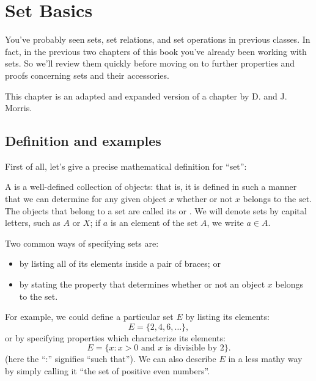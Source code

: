 




\section{Set Basics}

You've probably seen sets, set relations, and set operations in previous classes.  In fact, in the previous two chapters of this book you've already been working with sets.  So we'll review them quickly before moving on to further properties and proofs concerning sets and their accessories.
\medskip

This chapter is an adapted and expanded version of a chapter by D. and J. Morris.
 
\subsection{Definition and examples}

First of all, let's give a precise mathematical definition for ``set'':

\begin{defn} A  is a well-defined collection of objects: that is, it is defined in such a manner that we can determine for any given object $x$ whether or not $x$ belongs to the set.  The objects that belong to a set are called its  or . We will denote sets by capital letters, such as $A$ or $X$; if $a$ is an element of the set $A$, we write $a \in A$\label{sets_membership}.
\end{defn}
Two common ways of specifying sets are:
\begin{itemize}
\item
by listing all of its elements inside a pair of braces; or 
\item
by stating the property that determines whether or not an object $x$ belongs to the set. 
\end{itemize}
For example, we could define a particular set $E$ by listing its elements: 
\[
E = \{2, 4, 6, \ldots \}, \]
or by specifying properties which characterize its elements:
\[ E = \{ x :  x > 0  \textrm{ and } x \textrm{ is divisible by 2}\}.
\]
(here the ``:'' signifies ``such that'').  
We can also describe $E$  in a less mathy way by simply calling it ``the set of positive even numbers''.

